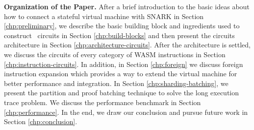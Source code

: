 \smallskip\noindent\textbf{Organization of the Paper.}
After a brief introduction to the basic ideas about how to connect a stateful virtual machine with SNARK in Section \ref{chp:preliminary}, we describe the basic building block and ingredients used to construct \zkwasm\, circuits in Section \ref{chp:build-blocks} and then present the circuits architecture in Section \ref{chp:architecture-circuits}. After the architecture is settled, we discuss the circuits of every category of WASM instructions in Section \ref{chp:instruction-circuits}. In addition, in Section \ref{chp:foreign} we discuss foreign instruction expansion which provides a way to extend the virtual machine for better performance and integration. In Section \ref{chp:sharding-batching}, we present the partition and proof batching technique to solve the long execution trace problem. We discuss the performance benchmark in Section \ref{chp:performance}. In the end, we draw our conclusion and pursue future work in Section \ref{chp:conclusion}.  

